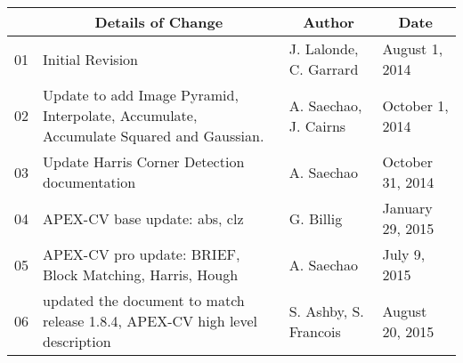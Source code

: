 \documentclass[oneside]{book}
\newcommand{\+}{\discretionary{\mbox{\scriptsize$\hookleftarrow$}}{}{}}
\begin{document}
\renewcommand{\arraystretch}{1.5}
\begin{table}[h]
\centering
\begin{tabular}{|p{1cm}|p{8cm}|p{2.5cm}|p{2.5cm}|}
\hline
\rowcolor[HTML]{C0C0C0} 
\multicolumn{1}{|c|}{\cellcolor[HTML]{C0C0C0}\textbf{Version}} & \multicolumn{1}{|c|}{\cellcolor[HTML]{C0C0C0}\textbf{Details of Change}}                                                  & \multicolumn{1}{|c|}{\cellcolor[HTML]{C0C0C0}\textbf{Author}} & \multicolumn{1}{|c|}{\cellcolor[HTML]{C0C0C0}\textbf{Date}} \\ \hline
01                                                             & Initial Revision                                                                                                          & J. Lalonde, \newline C. Garrard                               & August 1, 2014                                              \\ \hline
02                                                             & Update to add Image Pyramid, Interpolate, Accumulate, Accumulate Squared and Gaussian.                                    & A. Saechao, \newline J. Cairns                                & October 1, 2014                                             \\ \hline
03                                                             & Update Harris Corner Detection documentation                                                                              & A. Saechao                                                    & October 31, 2014                                            \\ \hline
04                                                             & APEX-CV base update: abs, clz                                                                                             & G. Billig                                                     & January 29, 2015                                            \\ \hline
05                                                             & APEX-CV pro update: BRIEF, Block Matching, Harris, Hough                                                                  & A. Saechao                                                    & July 9, 2015                                                \\ \hline
06                                                             & updated the document to match release 1.8.4, APEX-CV high level description                                               & S. Ashby, \newline S. Francois                                & August 20, 2015                                             \\ \hline

\end{tabular}
\end{table}
\end{document}
